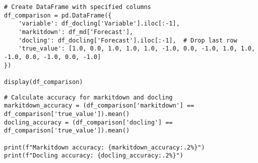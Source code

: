 \begin{verbatim}
# Create DataFrame with specified columns
df_comparison = pd.DataFrame({
    'variable': df_docling['Variable'].iloc[:-1],
    'markitdown': df_md['Forecast'],
    'docling': df_docling['Forecast'].iloc[:-1],  # Drop last row
    'true_value': [1.0, 0.0, 1.0, 1.0, 1.0, -1.0, 0.0, -1.0, 1.0, 1.0, -1.0, 0.0, -1.0, 0.0, -1.0]
})

display(df_comparison)
\end{verbatim}


\begin{verbatim}
# Calculate accuracy for markitdown and docling
markitdown_accuracy = (df_comparison['markitdown'] == df_comparison['true_value']).mean()
docling_accuracy = (df_comparison['docling'] == df_comparison['true_value']).mean()

print(f"Markitdown accuracy: {markitdown_accuracy:.2%}")
print(f"Docling accuracy: {docling_accuracy:.2%}") 
\end{verbatim}

